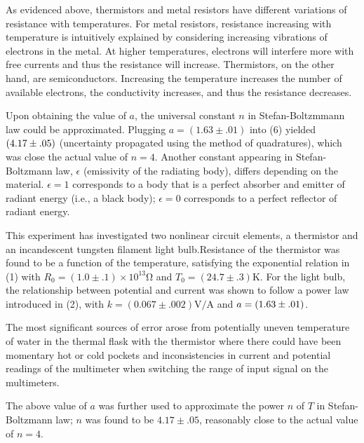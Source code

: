 \begin{paper}
	
	As evidenced above, thermistors and metal resistors have different variations of resistance with temperatures. For metal resistors, resistance increasing with temperature is intuitively explained by considering increasing vibrations of electrons in the metal. At higher temperatures, electrons will interfere more with free currents and thus the resistance will increase. Thermistors, on the other hand, are semiconductors. Increasing the temperature increases the number of available electrons, the conductivity increases, and thus the resistance decreases.
	
	Upon obtaining the value of \( a \), the universal constant \( n \) in Stefan-Boltzmmann law could be approximated. Plugging \( a = (1.63 \pm .01) \) into (6) yielded $\left(4.17\pm.05\right)$ (uncertainty propagated using the method  of quadratures), which was close the actual value of \( n = 4\). Another constant appearing in Stefan-Boltzmann law, \( \epsilon \) (emissivity of the radiating body), differs depending on the material. \( \epsilon = 1 \) corresponds to a body that is a perfect absorber and emitter of radiant energy (i.e., a black body); \( \epsilon = 0 \) corresponds to a perfect reflector of radiant energy. 
	

		This experiment has investigated two nonlinear circuit elements, a thermistor and an incandescent tungsten filament light bulb.\vfill\phantom{.}\columnbreak\noindent Resistance of the thermistor was found to be a function of the temperature, satisfying the exponential relation in (1) with \( R_0 = (1.0 \pm .1) \times 10^{13} \si{\ohm} \) and \( T_0 = (24.7 \pm .3) \si{\kelvin} \).  For the light bulb, the relationship between potential and current was shown to follow a power law introduced in (2), with \( k =  (0.067 \pm .002) \si{\volt\per\ampere} \) and \( a = \left(1.63 \pm .01\right) \).
		
		The most significant sources of error arose from potentially uneven temperature of water in the thermal flask with the thermistor where there could have been momentary hot or cold pockets and inconsistencies in current and potential readings of the multimeter when switching the range of input signal on the multimeters. 
		
		The above value of \( a \) was further used to approximate the power \( n \) of \( T \) in Stefan-Boltzmann law; \( n \) was found to be \( 4.17 \pm .05 \), reasonably close to the actual value of \( n = 4 \). 



\end{paper}

